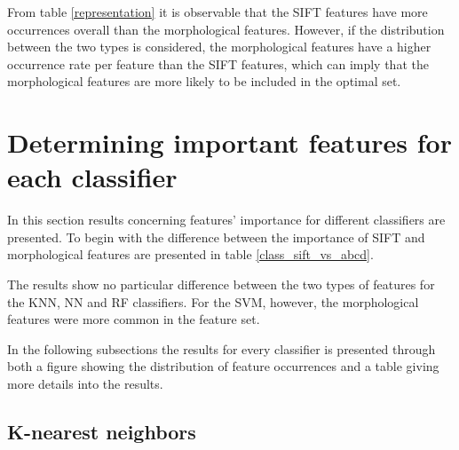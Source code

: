\documentclass{kththesis}
\begin{document}
From table \ref{representation} it is observable that the SIFT features have more occurrences overall than the morphological features. However, if the distribution between the two types is considered, the morphological features have a higher occurrence rate per feature than the SIFT features, which can imply that the morphological features are more likely to be included in the optimal set.

\section{Determining important features for each classifier}

In this section results concerning features' importance for different classifiers are presented. To begin with the difference between the importance of SIFT and morphological features are presented in table \ref{class_sift_vs_abcd}. 

\begin{table}[h!]
  \caption{}
  \label{class_sift_vs_abcd}
\end{table}

The results show no particular difference between the two types of features for the KNN, NN and RF classifiers. For the SVM, however, the morphological features were more common in the feature set.

In the following subsections the results for every classifier is presented through both a figure showing the distribution of feature occurrences and a table giving more details into the results.

\subsection{K-nearest neighbors}
\end{document}
